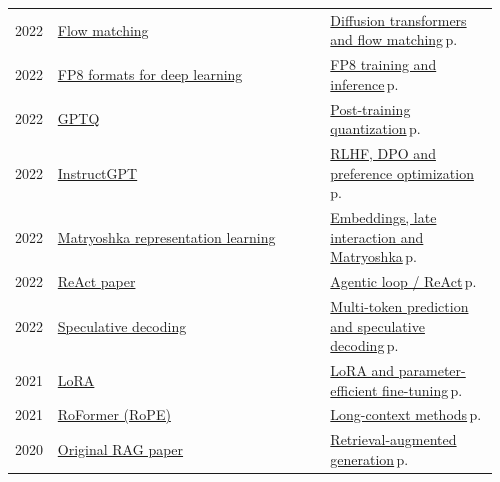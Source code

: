 \documentclass[10pt,a4paper,openany]{report}
\begin{document}
{\begin{longtable}{@{}p{0.07\linewidth}>{\raggedright}p{0.55\linewidth}>{\raggedright\arraybackslash}p{0.34\linewidth}@{}}
2022 & \href{https://arxiv.org/abs/2210.02747}{Flow matching} & \hyperref[c:embodied-5]{Diffusion transformers and flow matching}\,{\color{muted}\scriptsize p.\,\pageref{c:embodied-5}}\\
2022 & \href{https://arxiv.org/abs/2209.05433}{FP8 formats for deep learning} & \hyperref[c:quant-2]{FP8 training and inference}\,{\color{muted}\scriptsize p.\,\pageref{c:quant-2}}\\
2022 & \href{https://arxiv.org/abs/2210.17323}{GPTQ} & \hyperref[c:quant-3]{Post-training quantization}\,{\color{muted}\scriptsize p.\,\pageref{c:quant-3}}\\
2022 & \href{https://arxiv.org/abs/2203.02155}{InstructGPT} & \hyperref[c:reasoning-6]{RLHF, DPO and preference optimization}\,{\color{muted}\scriptsize p.\,\pageref{c:reasoning-6}}\\
2022 & \href{https://arxiv.org/abs/2205.13147}{Matryoshka representation learning} & \hyperref[c:context-8]{Embeddings, late interaction and Matryoshka}\,{\color{muted}\scriptsize p.\,\pageref{c:context-8}}\\
2022 & \href{https://arxiv.org/abs/2210.03629}{ReAct paper} & \hyperref[c:agents-3]{Agentic loop / ReAct}\,{\color{muted}\scriptsize p.\,\pageref{c:agents-3}}\\
2022 & \href{https://arxiv.org/abs/2211.17192}{Speculative decoding} & \hyperref[c:arch-6]{Multi-token prediction and speculative decoding}\,{\color{muted}\scriptsize p.\,\pageref{c:arch-6}}\\
2021 & \href{https://arxiv.org/abs/2106.09685}{LoRA} & \hyperref[c:training-5]{LoRA and parameter-efficient fine-tuning}\,{\color{muted}\scriptsize p.\,\pageref{c:training-5}}\\
2021 & \href{https://arxiv.org/abs/2104.09864}{RoFormer (RoPE)} & \hyperref[c:arch-7]{Long-context methods}\,{\color{muted}\scriptsize p.\,\pageref{c:arch-7}}\\
2020 & \href{https://arxiv.org/abs/2005.11401}{Original RAG paper} & \hyperref[c:context-5]{Retrieval-augmented generation}\,{\color{muted}\scriptsize p.\,\pageref{c:context-5}}\\
\end{longtable}}
\end{document}
